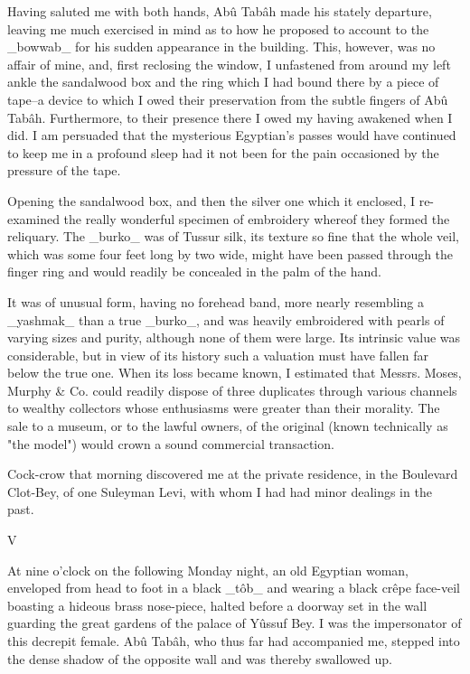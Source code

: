 Having saluted me with both hands, Abû Tabâh made his stately
departure, leaving me much exercised in mind as to how he proposed to
account to the _bowwab_ for his sudden appearance in the building.
This, however, was no affair of mine, and, first reclosing the window,
I unfastened from around my left ankle the sandalwood box and the ring
which I had bound there by a piece of tape--a device to which I owed
their preservation from the subtle fingers of Abû Tabâh. Furthermore,
to their presence there I owed my having awakened when I did. I am
persuaded that the mysterious Egyptian's passes would have continued
to keep me in a profound sleep had it not been for the pain occasioned
by the pressure of the tape.

Opening the sandalwood box, and then the silver one which it enclosed,
I re-examined the really wonderful specimen of embroidery whereof they
formed the reliquary. The _burko_ was of Tussur silk, its texture so
fine that the whole veil, which was some four feet long by two wide,
might have been passed through the finger ring and would readily be
concealed in the palm of the hand.

It was of unusual form, having no forehead band, more nearly
resembling a _yashmak_ than a true _burko_, and was heavily
embroidered with pearls of varying sizes and purity, although none of
them were large. Its intrinsic value was considerable, but in view of
its history such a valuation must have fallen far below the true one.
When its loss became known, I estimated that Messrs. Moses, Murphy &
Co. could readily dispose of three duplicates through various channels
to wealthy collectors whose enthusiasms were greater than their
morality. The sale to a museum, or to the lawful owners, of the
original (known technically as "the model") would crown a sound
commercial transaction.

Cock-crow that morning discovered me at the private residence, in the
Boulevard Clot-Bey, of one Suleyman Levi, with whom I had had minor
dealings in the past.


V

At nine o'clock on the following Monday night, an old Egyptian woman,
enveloped from head to foot in a black _tôb_ and wearing a black crêpe
face-veil boasting a hideous brass nose-piece, halted before a doorway
set in the wall guarding the great gardens of the palace of Yûssuf
Bey. I was the impersonator of this decrepit female. Abû Tabâh, who
thus far had accompanied me, stepped into the dense shadow of the
opposite wall and was thereby swallowed up.

